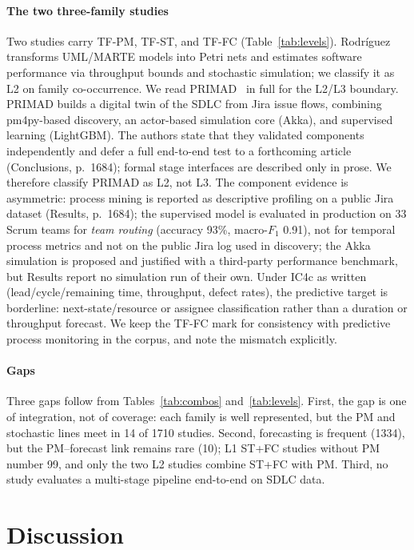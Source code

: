 \documentclass[preprint,12pt,authoryear=false]{elsarticle}
\newcommand{\PM}{TF-PM}
\newcommand{\ST}{TF-ST}
\newcommand{\FC}{TF-FC}
\begin{document}
\paragraph{The two three-family studies}
Two studies carry \PM{}, \ST{}, and \FC{} (Table~\ref{tab:levels}). Rodr{\'i}guez~\cite{rodriguez2017} transforms UML/MARTE models into Petri nets and estimates software performance via throughput bounds and stochastic simulation; we classify it as L2 on family co-occurrence. We read PRIMAD~\cite{guinea2025} in full for the L2/L3 boundary. PRIMAD builds a digital twin of the SDLC from Jira issue flows, combining pm4py-based discovery, an actor-based simulation core (Akka), and supervised learning (LightGBM). The authors state that they validated components independently and defer a full end-to-end test to a forthcoming article (Conclusions, p.~1684); formal stage interfaces are described only in prose. We therefore classify PRIMAD as L2, not L3. The component evidence is asymmetric: process mining is reported as descriptive profiling on a public Jira dataset (Results, p.~1684); the supervised model is evaluated in production on 33 Scrum teams for \emph{team routing} (accuracy 93\%, macro-$F_1$ 0.91), not for temporal process metrics and not on the public Jira log used in discovery; the Akka simulation is proposed and justified with a third-party performance benchmark, but Results report no simulation run of their own. Under IC4c as written (lead/cycle/remaining time, throughput, defect rates), the predictive target is borderline: next-state/resource or assignee classification rather than a duration or throughput forecast. We keep the \FC{} mark for consistency with predictive process monitoring in the corpus, and note the mismatch explicitly.

\paragraph{Gaps}
Three gaps follow from Tables~\ref{tab:combos} and~\ref{tab:levels}. First, the gap is one of integration, not of coverage: each family is well represented, but the PM and stochastic lines meet in 14 of 1710 studies. Second, forecasting is frequent (1334), but the PM--forecast link remains rare (10); L1 ST+FC studies without PM number 99, and only the two L2 studies combine ST+FC with PM. Third, no study evaluates a multi-stage pipeline end-to-end on SDLC data.

\section{Discussion}\label{sec:discussion}
\end{document}
